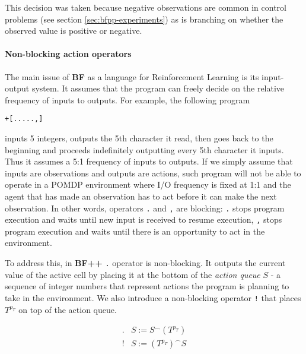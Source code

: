 This decision was taken because negative observations are common in control problems (see section \ref{sec:bfpp-experiments}) as is branching on whether the observed value is positive or negative. 

\paragraph{Non-blocking action operators}
\label{sec:queue}


The main issue of \textbf{BF} as a language for Reinforcement Learning is its input-output system.
It assumes that the program can freely decide on the relative frequency of inputs to outputs.
For example, the following program

\begin{center}
\begin{lstlisting}
+[.....,]
\end{lstlisting}
\end{center}

inputs 5 integers, outputs the 5th character it read, then goes back to the beginning and proceeds indefinitely outputting every 5th character it inputs.
Thus it assumes a 5:1 frequency of inputs to outputs.
If we simply assume that inputs are observations and outputs are actions, such program will not be able to operate in a POMDP environment where I/O frequency is fixed at 1:1 and the agent that has made an observation has to act before it can make the next observation.
In other words, operators \texttt{.} and \texttt{,} are blocking: \texttt{.} stops program execution and waits until new input is received to resume execution, \texttt{,} stops program execution and waits until there is an opportunity to act in the environment.

To address this, in \textbf{BF++} \texttt{.} operator is non-blocking.
It outputs the current value of the active cell by placing it at the bottom of the \textit{action queue} $S$ - a sequence of integer numbers that represent actions the program is planning to take in the environment. We also introduce a non-blocking operator \texttt{!} that places $T^{p_T}$ on top of the action queue.

\begin{equation}
    \begin{array}{cc}
         . & S := S^\frown (T^{p_T}) \\
         ! & S := (T^{p_T})^\frown S
    \end{array}
\end{equation}

